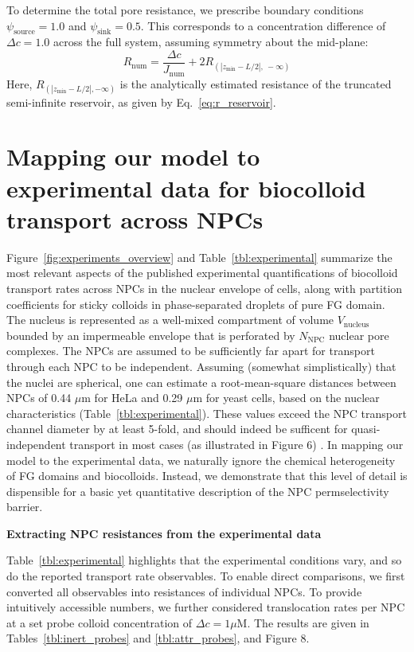 \documentclass[10pt, a4paper, twocolumn]{article}
\begin{document}
To determine the total pore resistance, we prescribe boundary conditions $\psi_{\text{source}} = 1.0$ and $\psi_{\text{sink}} = 0.5$.
This corresponds to a concentration difference of $\Delta c = 1.0$ across the full system, assuming symmetry about the mid-plane:
\begin{equation}
    R_{\text{num}} = \frac{\Delta c}{J_{\text{num}}} + 2 R_{\left(\left|z_{\text{min}} - L/2\right|,\ -\infty\right)}
\end{equation}
Here, $R_{(|z_{\text{min}} - L/2|, -\infty)}$ is the analytically estimated resistance of the truncated semi-infinite reservoir, as given by Eq.~\eqref{eq:r_reservoir}.


\pagebreak
\section{Mapping our model to experimental data for biocolloid transport across NPCs}

Figure~\ref{fig:experiments_overview} and Table~\ref{tbl:experimental} summarize the most relevant aspects of the published experimental quantifications of biocolloid transport rates across NPCs in the nuclear envelope of cells, along with partition coefficients for sticky colloids in phase-separated droplets of pure FG domain. 
The nucleus is represented as a well-mixed compartment of volume $V_\text{nucleus}$ bounded by an impermeable envelope that is perforated by $N_\text{NPC}$ nuclear pore complexes.
The NPCs are assumed to be sufficiently far apart for transport through each NPC to be independent.
Assuming (somewhat simplistically) that the nuclei are spherical, one can estimate a root-mean-square distances between NPCs of 0.44 $\mu$m for HeLa and 0.29 $\mu$m for yeast cells, based on the nuclear characteristics (Table~\ref{tbl:experimental}).
These values exceed the NPC transport channel diameter by at least 5-fold, and should indeed be sufficent for quasi-independent transport in most cases (as illustrated in Figure 6) \cite{Fabrikant1985}.
In mapping our model to the experimental data, we naturally ignore the chemical heterogeneity of FG domains and biocolloids.
Instead, we demonstrate that this level of detail is dispensible for a basic yet quantitative description of the NPC permselectivity barrier.

\bigskip\noindent
\textbf{Extracting NPC resistances from the experimental data}

\noindent
Table~\ref{tbl:experimental} highlights that the experimental conditions vary, and so do the reported transport rate observables.
To enable direct comparisons, we first converted all observables into resistances of individual NPCs.
To provide intuitively accessible numbers, we further considered translocation rates per NPC at a set probe colloid concentration of $\Delta c = 1 \mu \text{M}$.
The results are given in Tables~\ref{tbl:inert_probes} and \ref{tbl:attr_probes}, and Figure 8.
\end{document}
